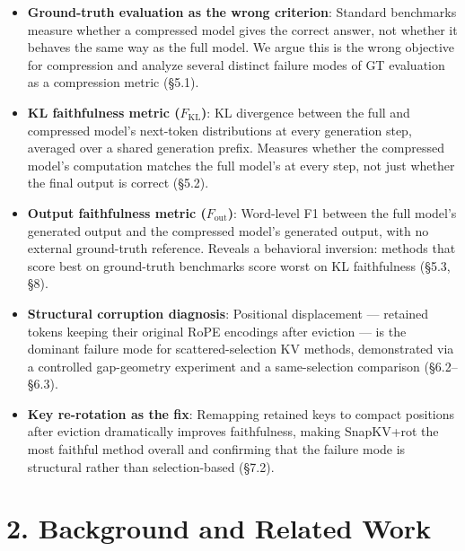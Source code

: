 \documentclass[10pt,letterpaper]{article}
\begin{document}
\begin{itemize}
\item
  \textbf{Ground-truth evaluation as the wrong criterion}: Standard
  benchmarks measure whether a compressed model gives the correct
  answer, not whether it behaves the same way as the full model. We
  argue this is the wrong objective for compression and analyze several
  distinct failure modes of GT evaluation as a compression metric
  (§5.1).
\item
  \textbf{KL faithfulness metric (\(F_{\text{KL}}\))}: KL divergence
  between the full and compressed model's next-token distributions at
  every generation step, averaged over a shared generation prefix.
  Measures whether the compressed model's computation matches the full
  model's at every step, not just whether the final output is correct
  (§5.2).
\item
  \textbf{Output faithfulness metric (\(F_{\text{out}}\))}: Word-level
  F1 between the full model's generated output and the compressed
  model's generated output, with no external ground-truth reference.
  Reveals a behavioral inversion: methods that score best on
  ground-truth benchmarks score worst on KL faithfulness (§5.3, §8).
\item
  \textbf{Structural corruption diagnosis}: Positional displacement ---
  retained tokens keeping their original RoPE encodings after eviction
  --- is the dominant failure mode for scattered-selection KV methods,
  demonstrated via a controlled gap-geometry experiment and a
  same-selection comparison (§6.2--§6.3).
\item
  \textbf{Key re-rotation as the fix}: Remapping retained keys to
  compact positions after eviction dramatically improves faithfulness,
  making SnapKV+rot the most faithful method overall and confirming that
  the failure mode is structural rather than selection-based (§7.2).
\end{itemize}

\hypertarget{background-and-related-work}{%
\section{2. Background and Related
Work}\label{background-and-related-work}}
\end{document}
